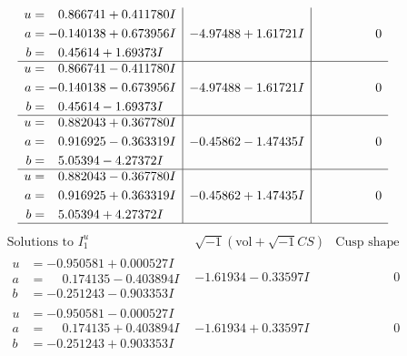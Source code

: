 \documentclass[1p]{elsarticle_modified}
\theoremstyle{definition}
\newcommand{\I}{\sqrt{-1}}
\begin{document}
$$\begin{array}{c|c|c}
\begin{aligned}
u &= \phantom{-}0.866741 + 0.411780 I \\
a &= -0.140138 + 0.673956 I \\
b &= \phantom{-}0.45614 + 1.69373 I\end{aligned}
 & -4.97488 + 1.61721 I & \phantom{-0.000000 } 0 \\ \hline\begin{aligned}
u &= \phantom{-}0.866741 - 0.411780 I \\
a &= -0.140138 - 0.673956 I \\
b &= \phantom{-}0.45614 - 1.69373 I\end{aligned}
 & -4.97488 - 1.61721 I & \phantom{-0.000000 } 0 \\ \hline\begin{aligned}
u &= \phantom{-}0.882043 + 0.367780 I \\
a &= \phantom{-}0.916925 - 0.363319 I \\
b &= \phantom{-}5.05394 - 4.27372 I\end{aligned}
 & -0.45862 - 1.47435 I & \phantom{-0.000000 } 0 \\ \hline\begin{aligned}
u &= \phantom{-}0.882043 - 0.367780 I \\
a &= \phantom{-}0.916925 + 0.363319 I \\
b &= \phantom{-}5.05394 + 4.27372 I\end{aligned}
 & -0.45862 + 1.47435 I & \phantom{-0.000000 } 0\\
 \hline 
 \end{array}$$\newpage$$\begin{array}{c|c|c}  
\text{Solutions to }I^u_{1}& \I (\text{vol} + \sqrt{-1}CS) & \text{Cusp shape}\\
 \hline 
\begin{aligned}
u &= -0.950581 + 0.000527 I \\
a &= \phantom{-}0.174135 - 0.403894 I \\
b &= -0.251243 - 0.903353 I\end{aligned}
 & -1.61934 - 0.33597 I & \phantom{-0.000000 } 0 \\ \hline\begin{aligned}
u &= -0.950581 - 0.000527 I \\
a &= \phantom{-}0.174135 + 0.403894 I \\
b &= -0.251243 + 0.903353 I\end{aligned}
 & -1.61934 + 0.33597 I & \phantom{-0.000000 } 0 \\ \hline\begin{aligned}

\end{aligned}
\end{array}$$
\end{document}
